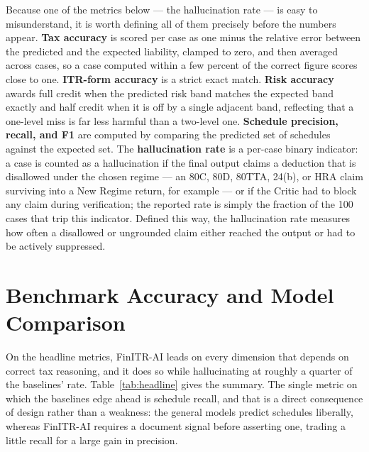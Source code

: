 Because one of the metrics below --- the hallucination rate --- is easy to
misunderstand, it is worth defining all of them precisely before the numbers
appear. \textbf{Tax accuracy} is scored per case as one minus the relative error
between the predicted and the expected liability, clamped to zero, and then
averaged across cases, so a case computed within a few percent of the correct
figure scores close to one. \textbf{ITR-form accuracy} is a strict exact match.
\textbf{Risk accuracy} awards full credit when the predicted risk band matches
the expected band exactly and half credit when it is off by a single adjacent
band, reflecting that a one-level miss is far less harmful than a two-level one.
\textbf{Schedule precision, recall, and F1} are computed by comparing the
predicted set of schedules against the expected set. The \textbf{hallucination
rate} is a per-case binary indicator: a case is counted as a hallucination if the
final output claims a deduction that is disallowed under the chosen regime --- an
80C, 80D, 80TTA, 24(b), or HRA claim surviving into a New Regime return, for
example --- or if the Critic had to block any claim during verification; the
reported rate is simply the fraction of the 100 cases that trip this indicator.
Defined this way, the hallucination rate measures how often a disallowed or
ungrounded claim either reached the output or had to be actively suppressed.

\section{Benchmark Accuracy and Model Comparison}
\label{sec:result-set-1}

On the headline metrics, FinITR-AI leads on every dimension that depends on
correct tax reasoning, and it does so while hallucinating at roughly a quarter
of the baselines' rate. Table~\ref{tab:headline} gives the summary. The single
metric on which the baselines edge ahead is schedule recall, and that is a
direct consequence of design rather than a weakness: the general models predict
schedules liberally, whereas FinITR-AI requires a document signal before
asserting one, trading a little recall for a large gain in precision.

